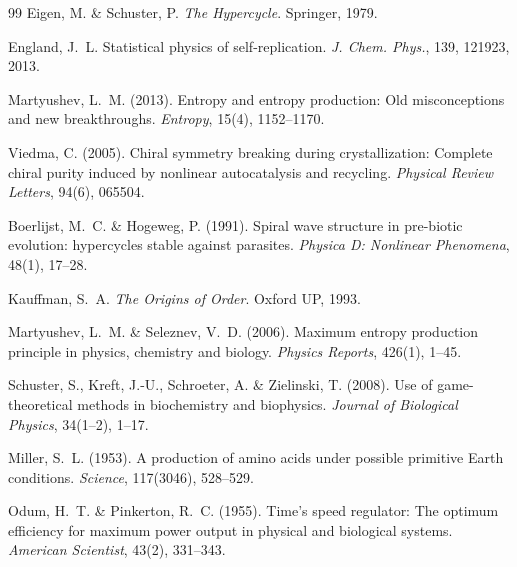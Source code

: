 \documentclass[12pt,a4paper]{article}
\theoremstyle{remark}
\begin{document}
\begin{thebibliography}{99}
Eigen, M. \& Schuster, P.
\newblock \textit{The Hypercycle}.
\newblock Springer, 1979.

England, J.~L.
\newblock Statistical physics of self-replication.
\newblock \textit{J. Chem. Phys.}, 139, 121923, 2013.

Martyushev, L.~M. (2013).
\newblock Entropy and entropy production: Old misconceptions and new breakthroughs.
\newblock \textit{Entropy}, 15(4), 1152--1170.


Viedma, C. (2005).
\newblock Chiral symmetry breaking during crystallization: Complete chiral purity induced by nonlinear autocatalysis and recycling.
\newblock \textit{Physical Review Letters}, 94(6), 065504.

Boerlijst, M.~C. \& Hogeweg, P. (1991).
\newblock Spiral wave structure in pre-biotic evolution: hypercycles stable against parasites.
\newblock \textit{Physica D: Nonlinear Phenomena}, 48(1), 17--28.

Kauffman, S.~A.
\newblock \textit{The Origins of Order}.
\newblock Oxford UP, 1993.

Martyushev, L.~M. \& Seleznev, V.~D. (2006).
\newblock Maximum entropy production principle in physics, chemistry and biology.
\newblock \textit{Physics Reports}, 426(1), 1--45.

Schuster, S., Kreft, J.-U., Schroeter, A. \& Zielinski, T. (2008).
\newblock Use of game-theoretical methods in biochemistry and biophysics.
\newblock \textit{Journal of Biological Physics}, 34(1--2), 1--17.

Miller, S.~L. (1953).
\newblock A production of amino acids under possible primitive Earth conditions.
\newblock \textit{Science}, 117(3046), 528--529.

Odum, H.~T. \& Pinkerton, R.~C. (1955).
\newblock Time's speed regulator: The optimum efficiency for maximum power output in physical and biological systems.
\newblock \textit{American Scientist}, 43(2), 331--343.


\end{thebibliography}
\end{document}
